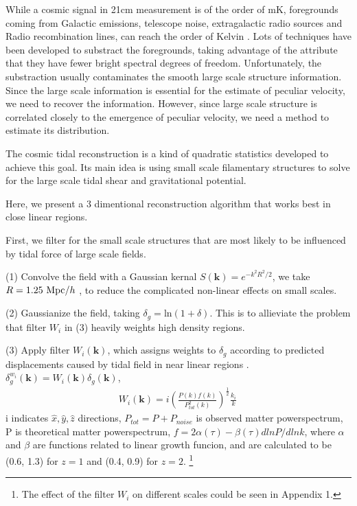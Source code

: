 While a cosmic signal in 21cm measurement is of the order of mK,  
foregrounds coming from Galactic emissions, telescope noise, 
extragalactic radio sources and Radio recombination lines, 
can reach the order of Kelvin \cite{DiMatteo04}\cite{Masui13}. 
Lots of techniques have been developed to substract the foregrounds, 
taking advantage of the attribute that they have fewer bright spectral
degrees of freedom\cite{Switzer15}.
Unfortunately, the substraction usually contaminates the smooth large scale structure information.
Since the large scale information is essential for the estimate of
peculiar velocity, we need to recover the information.
However, since large scale structure is correlated closely to the emergence of peculiar velocity, we need a method to estimate its distribution.

The cosmic tidal reconstruction is a kind of quadratic statistics developed to achieve this goal.
Its main idea is using small scale filamentary structures to solve for the large scale tidal shear and gravitational potential.

Here, we present a 3 dimentional reconstruction algorithm that works best in close linear regions.

First, we filter for the small scale structures that are most likely to be influenced by tidal force of large scale fields.

(1) Convolve the field with a Gaussian kernal
$S(\bm{k})=e^{-k^2R^2/2}$, 
we take $R=1.25\ \mathrm{Mpc}/h$ \cite{2012:pen},
to reduce the complicated non-linear effects on small scales.

(2) Gaussianize the field, taking 
$\delta_g=\mathrm{ln}(1+\delta)$. 
This is to allieviate the problem that filter $W_i$ in (3) heavily weights high density regions.

(3) Apply filter $W_i(\bm{k})$, which assigns weights to $\delta_g$ according to predicted displacements caused by tidal field in near linear regions \cite{2015:zhu}.
${\delta}^{w_i}_g(\bm{k})=W_i(\bm{k})\delta_g(\bm{k})$, 
\begin{eqnarray}
\label{eq:wi}
W_i(\bm{k})=i (\frac{P(k)f(k)}{P_{tot}^2(k)})^{\frac{1}{2}}\frac{k_i}{k}\,
\end{eqnarray}
i indicates $\hat x,\hat y,\hat z$ directions, 
$P_{tot}=P+P_{noise}$ is observed matter powerspectrum, 
P is theoretical matter powerspectrum,
$f=2\alpha(\tau)-\beta(\tau)dlnP/dlnk$, 
where $\alpha$ and $\beta$ are functions related to linear growth funcion, and are calculated to be (0.6, 1.3) for $z=1$ and (0.4, 0.9) for $z=2$.
\footnote{The effect of the filter $W_i$ on different scales could be seen in Appendix 1.}


